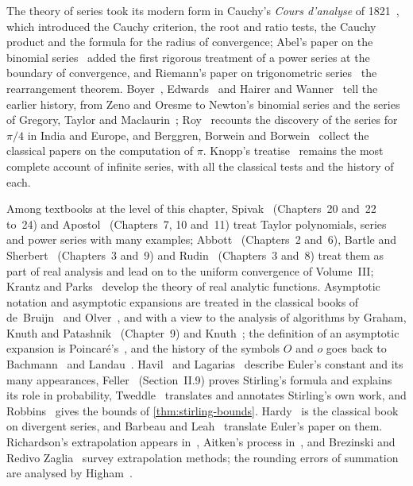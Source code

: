 The theory of series took its modern form in Cauchy's \emph{Cours d'analyse} of 1821~\cite{cauchy1821}, which introduced the Cauchy criterion, the root and ratio tests, the Cauchy product and the formula for the radius of convergence; Abel's paper on the binomial series~\cite{abel1826} added the first rigorous treatment of a power series at the boundary of convergence, and Riemann's paper on trigonometric series~\cite{riemann1867} the rearrangement theorem. Boyer~\cite{boyer1959}, Edwards~\cite{edwards1979} and Hairer and Wanner~\cite{hairer1996analysis} tell the earlier history, from Zeno and Oresme to Newton's binomial series and the series of Gregory, Taylor and Maclaurin~\cite{taylor1715,maclaurin1742}; Roy~\cite{roy1990} recounts the discovery of the series for $\pi/4$ in India and Europe, and Berggren, Borwein and Borwein~\cite{berggren2004pi} collect the classical papers on the computation of $\pi$. Knopp's treatise~\cite{knopp1990} remains the most complete account of infinite series, with all the classical tests and the history of each.

Among textbooks at the level of this chapter, Spivak~\cite{spivak2008calculus} (Chapters~20 and~22 to~24) and Apostol~\cite{apostol1967calculus} (Chapters~7, 10 and~11) treat Taylor polynomials, series and power series with many examples; Abbott~\cite{abbott2015} (Chapters~2 and~6), Bartle and Sherbert~\cite{bartle2011} (Chapters~3 and~9) and Rudin~\cite{rudin1976} (Chapters~3 and~8) treat them as part of real analysis and lead on to the uniform convergence of Volume~III; Krantz and Parks~\cite{krantz2002primer} develop the theory of real analytic functions. Asymptotic notation and asymptotic expansions are treated in the classical books of de~Bruijn~\cite{debruijn1981} and Olver~\cite{olver1997asymptotics}, and with a view to the analysis of algorithms by Graham, Knuth and Patashnik~\cite{graham1994concrete} (Chapter~9) and Knuth~\cite{knuth1976bigomega,knuth1997taocp1}; the definition of an asymptotic expansion is Poincar\'e's~\cite{poincare1886}, and the history of the symbols $O$ and $o$ goes back to Bachmann~\cite{bachmann1894} and Landau~\cite{landau1909}. Havil~\cite{havil2003gamma} and Lagarias~\cite{lagarias2013gamma} describe Euler's constant and its many appearances, Feller~\cite{feller1968} (Section~II.9) proves Stirling's formula and explains its role in probability, Tweddle~\cite{tweddle2003} translates and annotates Stirling's own work, and Robbins~\cite{robbins1955} gives the bounds of \cref{thm:stirling-bounds}. Hardy~\cite{hardy1949divergent} is the classical book on divergent series, and Barbeau and Leah~\cite{barbeau1976} translate Euler's paper on them. Richardson's extrapolation appears in~\cite{richardson1911}, Aitken's process in~\cite{aitken1926}, and Brezinski and Redivo Zaglia~\cite{brezinski1991} survey extrapolation methods; the rounding errors of summation are analysed by Higham~\cite{higham2002accuracy}.

\chapterreferences
